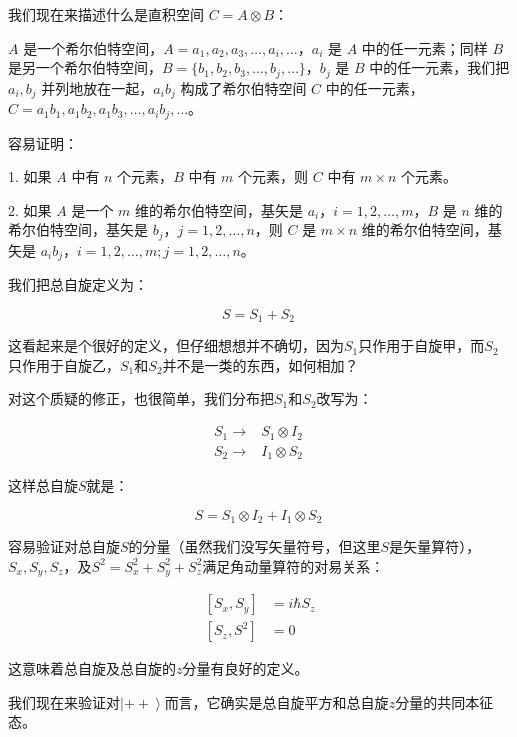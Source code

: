我们现在来描述什么是直积空间 $C = A \otimes B$：

$A$ 是一个希尔伯特空间，$A = {a_1, a_2, a_3, \ldots, a_i, \ldots}$，$a_i$ 是 $A$ 中的任一元素；同样 $B$ 是另一个希尔伯特空间，$B = \{b_1, b_2, b_3, \ldots, b_j, \ldots\}$，$b_j$ 是 $B$ 中的任一元素，我们把 $a_i, b_j$ 并列地放在一起，$a_i b_j$ 构成了希尔伯特空间 $C$ 中的任一元素，$C = {a_1 b_1, a_1 b_2, a_1 b_3, \ldots, a_i b_j, \ldots}$。

容易证明：

1. 如果 $A$ 中有 $n$ 个元素，$B$ 中有 $m$ 个元素，则 $C$ 中有 $m \times n$ 个元素。

2. 如果 $A$ 是一个 $m$ 维的希尔伯特空间，基矢是 ${a_i}$，$i=1,2,\ldots,m$，$B$ 是 $n$ 维的希尔伯特空间，基矢是 ${b_j}$，$j=1,2,\ldots,n$，则 $C$ 是 $m \times n$ 维的希尔伯特空间，基矢是 ${a_i b_j}$，$i=1,2,\ldots,m; j=1,2,\ldots,n$。

我们把总自旋定义为：

\begin{equation}
S= S_1 + S_2~
\end{equation}

这看起来是个很好的定义，但仔细想想并不确切，因为$S_1$只作用于自旋甲，而$S_2$只作用于自旋乙，$S_1$和$S_2$并不是一类的东西，如何相加？

对这个质疑的修正，也很简单，我们分布把$S_1$和$S_2$改写为：

\begin{align}
S_1  \to & S_1 \otimes  I_2 \\
S_2  \to & I_1 \otimes S_2~
\end{align}

这样总自旋$S$就是：

\begin{equation}
S= S_1 \otimes I_2 +  I_1 \otimes S_2~
\end{equation}

容易验证对总自旋$S$的分量（虽然我们没写矢量符号，但这里$S$是矢量算符），$S_x, S_y, S_z$，及$S^2 = S_x^2 + S_y^2 + S_z^2$满足角动量算符的对易关系：

\begin{align}
\left[ S_x, S_y \right] & =  i \hbar S_z \\
\left[ S_z , S^2 \right] & =  0~
\end{align}

这意味着总自旋及总自旋的$z$分量有良好的定义。

我们现在来验证对$\left| ++ \right\rangle$而言，它确实是总自旋平方和总自旋$z$分量的共同本征态。

